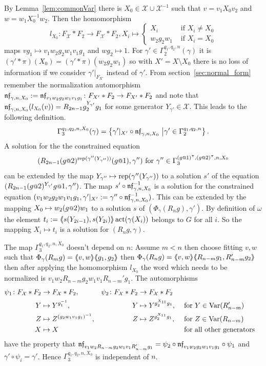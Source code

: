 \documentclass[a4paper,11pt]{amsart}
\begin{document}
 By Lemma~\ref{lem:commonVar} there is 
 $X_0 \in \mathcal{X}\cup \mathcal{X}^{-1}$ such that $v=v_1X_0v_2$ and $w=w_1X_0^{-1}w_2$. Then the homomorphism
 \[l_{X_0}\colon F_{\mathcal{X}}*F_2\to F_{\mathcal{X}}*F_2, X_i \mapsto \begin{cases}
						X_i &\text{ if } X_i\neq {X_0} \\
						w_2g_2w_1 &\text{ if }X_i= {X_0} 
                                             \end{cases}\]
 maps $vg_1 \mapsto v_1w_2g_2w_1v_1g_1$ and $wg_2\mapsto 1$. 
 For $\gamma'\in \Gamma_2^{q_1,q_2,n}(\gamma)$ it is $(\gamma'*\pi)(X_0)=({\gamma'*\pi})(w_2g_2w_1)$ 
 so with $X'=X\setminus X_0$ there is no loss of information if 
 we consider $\gamma'|_{F_{X'}}$ instead of $\gamma'$.
 From section~\ref{sec:normal_form} remember the normalization 
 automorphism $\mathfrak{nf}_{\gamma,n,X_0}:=\mathfrak{nf}_{v_1w_2g_2w_1v_1g_1}\colon F_{X'}*F_2 \to F_{X'}*F_2$
  and note that
 $\mathfrak{nf}_{\gamma,n,X_0}(l_{X_0}(v))=R_{2n-1}g_2^{{Y_{\gamma'}}}g_1$ for some generator ${Y_{\gamma'}}\in\mathcal{X}$.
 This leads to the following definition.
 \[\Gamma_3^{q_1,q_2,n,X_0}(\gamma) = \left\{\gamma'|_{X'} \circ \mathfrak{nf}_{\gamma,n,X_0} \ \middle \vert \gamma' \in \Gamma_2^{q_1,q_2,n} \right\}.\] 
 A solution for the the constrained equation
 \[(R_{2n-1}(g\at2)^{\textup{rep}(\gamma''({Y_{\gamma''}}))}(g\at1),\gamma'')\textup{ for }\gamma'' \in \Gamma_3^{(g\at{1})^\pi,(g\at{2})^\pi,n,X_0}\]
 can be 
 extended by the map ${Y_{\gamma''}}\mapsto \textup{rep}(\gamma''({Y_{\gamma''}}))$ to a solution $s'$ 
 of the equation $(R_{2n-1} (g\at{2})^{{Y_{\gamma'}}} g\at{1},\gamma'')$. The map $s'\circ \mathfrak{nf}_{\gamma,n,X_0}^{-1}$ 
 is a solution for the constrained equation $(v_1w_2g_2w_1v_1g_1,\gamma'|_{X'}:=\gamma'' \circ \mathfrak{nf}_{\gamma,n,X_0}^{-1})$.
 This can be extended by the mapping $X_0\mapsto w_2(g\at{2})w_1$ to a solution $s$ of $(\Phi_\gamma(R_n g),\gamma')$.
 By definition of $\omega$ the element $t_i:=\langle\negthickspace\langle s(Y_{2i-1}),s(Y_{2i})\rangle\negthickspace\rangle\operatorname{act}(\gamma(X_i))$ belongs to 
 $G$ for all $i$. So the mapping $X_i\mapsto t_i$ is a solution for $(R_ng,\gamma)$.
 
 The map $\Gamma_3^{q_1,q_2,n,X_0}$ doesn't depend on %
 $n$: Assume $m<n$ then choose  
 fitting $v,w$ such that $\Phi_\gamma(R_mg)=\langle\negthickspace\langle v,w\rangle\negthickspace\rangle\langle\negthickspace\langle g_1,g_2\rangle\negthickspace\rangle$ then $\Phi_\gamma(R_ng)=\langle\negthickspace\langle v,w\rangle\negthickspace\rangle\langle\negthickspace\langle R_{n-m}g_1,R_{n-m}'g_2\rangle\negthickspace\rangle$ 
 then after applying the homomorphism $l_{X_0}$ 
 the word which needs to be normalized is $v_1w_2R_{n-m}g_2w_1v_1R_{n-m}'g_1$. The automorphisms
 \begin{align*}
 \psi_1 \colon F_{\mathcal{X}}*F_2 &\to F_{\mathcal{X}}*F_2, & \psi_2 \colon F_{\mathcal{X}}*F_2 &\to F_{\mathcal{X}}*F_2\\
 Y &\mapsto Y^{g_1^{-1}}, & Y &\mapsto Y^{g_2^{X_{11}}g_1}, & &\text{ for }Y\in \textup{Var}(R_{n-m}')\\
 Z &\mapsto Z^{(g_2w_1v_1g_1)^{-1}},& Z &\mapsto Z^{g_2^{X_{11}}g_1},  & &\text{ for }Z\in \textup{Var}(R_{n-m})\\
 X &\mapsto X & & & &\text{ for all other generators}
 \end{align*}
 have the property that $\mathfrak{nf}_{v_1w_2R_{n-m}g_2w_1v_1R_{n-m}'g_1} = \psi_2\circ\mathfrak{nf}_{v_1w_2g_2w_1v_1g_1}\circ \psi_1$ and 
 $\gamma' \circ \psi_i = \gamma'$. Hence $\Gamma_3^{q_1,q_2,n,X_0}$ is independent of $n$.
 
\end{document}
